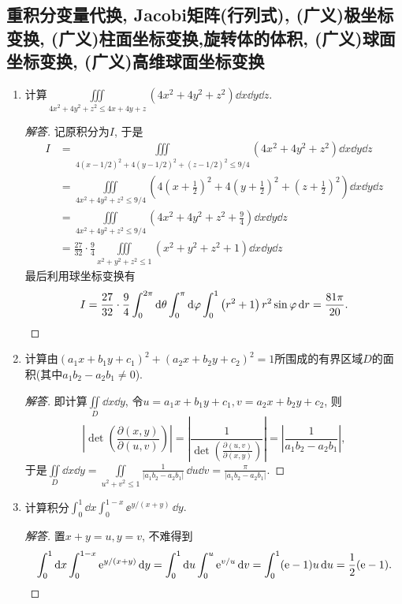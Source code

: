 \subsection{重积分变量代换, Jacobi矩阵(行列式), (广义)极坐标变换, (广义)柱面坐标变换,旋转体的体积, (广义)球面坐标变换, (广义)高维球面坐标变换}
\begin{quiza}
\begin{enumerate}
\item 计算\(\iiint\limits_{4x^2+4y^2+z^2\leqslant 4x+4y+z}\left(4x^2+4y^2+z^2\right)\dd x\dd y\dd z\).
\begin{proof}[解答]
记原积分为\(I\), 于是
\begin{align}
I&=\iiint\limits_{4(x-1/2)^2+4(y-1/2)^2+(z-1/2)^2\leqslant 9/4}\left(4x^2+4y^2+z^2\right)\dd x\dd y\dd z\\%
&=\iiint\limits_{4x^2+4y^2+z^2\leqslant 9/4}\left(4\left(x+\frac{1}{2}\right)^2
+4\left(y+\frac{1}{2}\right)^2+\left(z+\frac{1}{2}\right)^2\right)\dd x\dd y\dd z%
\\
&=\iiint\limits_{4x^2+4y^2+z^2\leqslant 9/4}
\left(4x^2+4y^2+z^2+\frac{9}{4}\right)\dd x\dd y\dd z%
\\
&=\frac{27}{32}\cdot\frac{9}{4}\iiint\limits_{x^2+y^2+z^2\leqslant 1}
\left(x^2+y^2+z^2+1\right)\dd x\dd y\dd z%
\end{align}
最后利用球坐标变换有\[I=\frac{27}{32}\cdot\frac{9}{4}
\int_{0}^{2\pi}\mathrm{d}\theta\int_{0}^{\pi}\mathrm{d}\varphi\int_{0}^{1}
\left(r^2+1\right)r^2\sin\varphi\,\mathrm{d} r=\frac{81\pi}{20}.\qedhere\]
\end{proof}
\item 计算由\((a_1x+b_1y+c_1)^2+(a_2x+b_2y+c_2)^2=1\)所围成的有界区域\(D\)的面积(其中\(a_1b_2-a_2b_1\ne 0\)).
\begin{proof}[解答]
即计算\(\iint\limits_{D}\dd x\dd y\), 令\(u=a_1x+b_1y+c_1,v=a_2x+b_2y+c_2\), 则
\[\left|\det\left(\frac{\partial(x,y)}{\partial(u,v)}\right)\right|
=\left|\frac{1}{\det\left(\displaystyle\frac{\partial(u,v)}{\partial(x,y)}\right)}\right|
=\left|\frac{1}{a_1b_2-a_2b_1}\right|,\]
于是\(\iint\limits_{D}\dd x\dd y=\iint\limits_{u^2+v^2\leqslant 1}\frac{1}{|a_1b_2-a_2b_1|}\,\dd u\dd v=\frac{\pi}{|a_1b_2-a_2b_1|}\).
\end{proof}

\item 计算积分\(\int_{0}^{1}\dd x\int_{0}^{1-x}\ee^{y/(x+y)}\,\dd y.\)
\begin{proof}[解答]
置\(x+y=u,y=v\), 不难得到\[\int_{0}^{1}\mathrm{d} x\int_{0}^{1-x}\mathrm{e}^{y/(x+y)}\,\mathrm{d} y
=\int_{0}^{1}\mathrm{d} u\int_{0}^{u}\mathrm{e}^{v/u}\,\mathrm{d} v
=\int_{0}^{1}(\mathrm{e}-1)u\,\mathrm{d} u=\frac{1}{2}(\mathrm{e}-1).\qedhere\]
\end{proof}


\end{enumerate}
\end{quiza}
